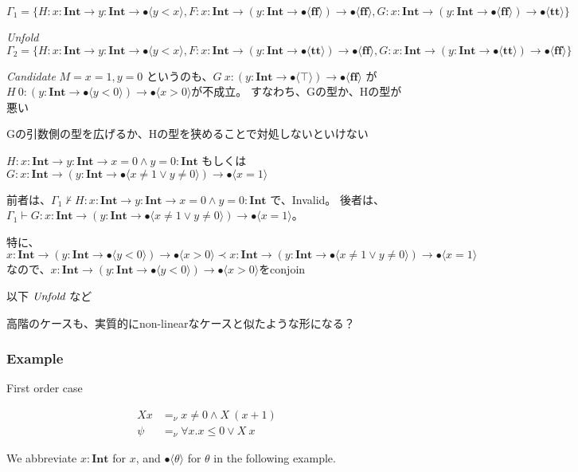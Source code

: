 \documentclass[runningheads]{llncs}
\newcommand\COL{\mathbin{:}}
\newcommand \true {\textbf{tt}}
\newcommand \false {\textbf{ff}}
\newcommand \stypeint {\textbf{Int}}
\newcommand \stypebool {\bullet}
\newcommand \typeint[1]{{#1} : \stypeint}
\newcommand \typebool[1]{\stypebool \langle #1 \rangle}
\newcommand {\rcandidate} {\emph{Candidate}}
\newcommand {\runfold} {\emph{Unfold}}
\begin{document}
\( \Gamma_1 =
\{ H \COL \typeint{x} \to \typeint{y} \to \typebool{y < x},
F \COL \typeint{x} \to (\typeint{y} \to \typebool{\false}) \to \typebool{\false},
G \COL \typeint{x} \to (\typeint{y} \to \typebool{\false}) \to \typebool{\true}
\}
\)

\runfold{}
\(
\Gamma_2 = \{ H \COL \typeint{x} \to \typeint{y} \to \typebool{y < x},
F \COL \typeint{x} \to (\typeint{y} \to \typebool{\true}) \to \typebool{\false},
G \COL \typeint{x} \to (\typeint{y} \to \typebool{\true}) \to \typebool{\false}
\}
\)

\rcandidate{}
\(
M = x = 1, y = 0
\)
というのも、\( G\ x \COL (\typeint{y} \to \typebool{\top}) \to \typebool{\false} \) が \( H\ 0 \COL (\typeint{y} \to \typebool{y < 0}) \to \typebool{x > 0} \)が不成立。
すなわち、Gの型か、Hの型が悪い

Gの引数側の型を広げるか、Hの型を狭めることで対処しないといけない

\( H \COL \typeint{x} \to \typeint{y} \to \typeint{x = 0 \wedge y = 0} \)
もしくは
\( G \COL \typeint{x} \to (\typeint{y} \to \typebool{x \neq 1 \lor y \neq 0}) \to \typebool{x = 1} \)

前者は、\( \Gamma_1 \not \vdash H \COL \typeint{x} \to \typeint{y} \to \typeint{x = 0 \wedge y = 0} \) で、Invalid。
後者は、\( \Gamma_1 \vdash G \COL \typeint{x} \to (\typeint{y} \to \typebool{x \neq 1 \lor y \neq 0}) \to \typebool{x = 1} \)。

特に、\( \typeint{x} \to (\typeint{y} \to \typebool{y < 0}) \to \typebool{x > 0} \prec \typeint{x} \to (\typeint{y} \to \typebool{x \neq 1 \lor y \neq 0}) \to \typebool{x = 1} \) なので、\( \typeint{x} \to (\typeint{y} \to \typebool{y < 0}) \to \typebool{x > 0} \)をconjoin

以下 \( \runfold{} \) など

高階のケースも、実質的にnon-linearなケースと似たような形になる？

\subsubsection{Example}

First order case

\begin{align*}
    X x &=_\nu x \neq 0 \land X\ (x + 1) \\
    \psi  &=_\nu \forall x. x \leq 0 \lor X\ x
\end{align*}

We abbreviate \(\typeint{x}\) for \(x\), and \(\typebool{\theta}\) for
\(\theta\) in the following example.
\end{document}
